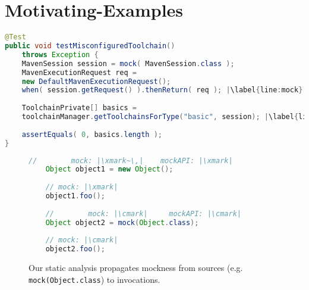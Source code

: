\chapter{Motivating-Examples}

\begin{lstlisting}[basicstyle=\ttfamily, caption={This code snippet illustrates an example from maven-core, where calls to both the focal method \texttt{getToolchainsForType()} and to mock \texttt{session}'s \texttt{getRequest()} method occur in test \textit{testMisconfiguredToolchain()}.},
basicstyle=\scriptsize\ttfamily,language = Java, framesep=4.5mm, escapechar=|,
framexleftmargin=1.0mm, captionpos=b, label=lis:mockCall, morekeywords={@Test}]
@Test
public void testMisconfiguredToolchain()
	throws Exception {
	MavenSession session = mock( MavenSession.class );
	MavenExecutionRequest req = 
	new DefaultMavenExecutionRequest();
	when( session.getRequest() ).thenReturn( req ); |\label{line:mock}|
	
	ToolchainPrivate[] basics =
	toolchainManager.getToolchainsForType("basic", session); |\label{line:real}|
	
	assertEquals( 0, basics.length );
}
\end{lstlisting}


\begin{figure}
	\begin{lstlisting}[basicstyle=\ttfamily,
	basicstyle=\scriptsize\ttfamily,language = Java, framesep=4.5mm, framexleftmargin=1.0mm, captionpos=b, escapechar=|, morekeywords={@Test}]
	//        mock: |\xmark~\,|    mockAPI: |\xmark|
	Object object1 = new Object();
	
	// mock: |\xmark|
	object1.foo();
	
	//        mock: |\cmark|     mockAPI: |\cmark|
	Object object2 = mock(Object.class);
	
	// mock: |\cmark|
	object2.foo();
	\end{lstlisting}
	
	\caption{Our static analysis propagates mockness from sources (e.g. \texttt{mock(Object.class}) to invocations.}
	\label{fig:mockMethodIllustration}
	
\end{figure}

